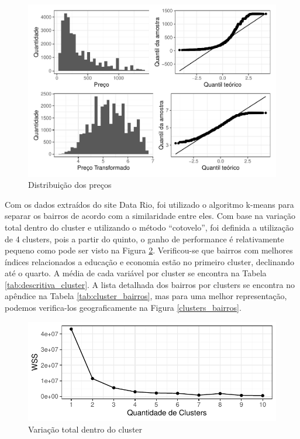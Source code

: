 \documentclass[
	12pt,				%
	a4paper,		%
	oneside,    %
	chapter=TITLE,		   %
	section=TITLE,		   %
	subsection=TITLE,	   %
	subsubsection=TITLE, %
	english,			%
	french,				%
	spanish,			%
	brazil,				%
]{abntex2}
\begin{document}
\begin{figure}
\centering
\includegraphics{00-TCC_files/figure-latex/dist_preco-1.pdf}
\caption{\label{dist_preco}Distribuição dos preços}
\end{figure}

Com os dados extraídos do site Data Rio, foi utilizado o algoritmo
k-means para separar os bairros de acordo com a similaridade entre eles.
Com base na variação total dentro do cluster e utilizando o método
``cotovelo'', foi definida a utilização de 4 clusters, pois a partir do
quinto, o ganho de performance é relativamente pequeno como pode ser
visto na Figura \ref{wss}. Verificou-se que bairros com melhores índices
relacionados a educação e economia estão no primeiro cluster, declinando
até o quarto. A média de cada variável por cluster se encontra na Tabela
\ref{tab:descritiva_cluster}. A lista detalhada dos bairros por clusters
se encontra no apêndice na Tabela \ref{tab:cluster_bairros}, mas para
uma melhor representação, podemos verifica-los geograficamente na Figura
\ref{clusters_bairros}.

\begin{figure}
\centering
\includegraphics{00-TCC_files/figure-latex/wss-1.pdf}
\caption{\label{wss}Variação total dentro do cluster}
\end{figure}
\end{document}
